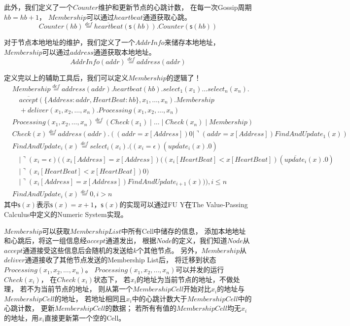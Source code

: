 此外，我们定义了一个$Counter$维护和更新节点的心跳计数，
在每一次Gossip周期$hb=hb+1$，
$Membership$可以通过$heartbeat$通道获取心跳。
\begin{equation}
   Counter(hb)\stackrel{def}{=}\overline{heartbeat}(\mathsf{s}(hb)).Counter(\mathsf{s}(hb))
\end{equation}

对于节点本地地址的维护，我们定义了一个$AddrInfo$来储存本地地址，
$Membership$可以通过$address$通道获取本地地址。
\begin{equation}
   AddrInfo(addr)\stackrel{def}{=}\overline{address}(addr)
\end{equation}

定义完以上的辅助工具后，我们可以定义$Membership$的逻辑了！
\begin{equation}
   \begin{split}
    &Membership\stackrel{def}{=}address(addr).heartbeat(hb).select_1(x_1)\dots select_n(x_n).\\
    &\quad\overline{accept}(\{Address:addr,HeartBeat:hb\},x_1,\dots,x_n).Membership\\
    &\quad+deliver(x_1,x_2,\dots,x_n).Processing(x_1,x_2,\dots,x_n)\\
    &Processing(x_1,x_2,\dots,x_n)\stackrel{def}{=}(Check(x_1)\mid  \dots \mid Check(x_n) \mid Membership)\\
    &Check(x)\stackrel{def}{=}address(addr).((addr=x[Address])0|\urcorner(addr=x[Address])FindAndUpdate_1(x))\\
    &FindAndUpdate_i(x)\stackrel{def}{=}select_i(x_i).((x_i = \epsilon) (\overline{update_i}(x).0)\\
    &\quad\mid \urcorner(x_i = \epsilon)((x_i[Address]=x[Address])((x_i[HeartBeat]<x[HeartBeat])(\overline{update_i}(x).0)\\
    &\quad\mid \urcorner (x_i[HeartBeat]<x[HeartBeat])0)\\
    &\quad\mid \urcorner (x_i[Address]=x[Address])FindAndUpdate_{i+1}(x))),i\leq n\\
    &FindAndUpdate_i(x)\stackrel{def}{=}0,i>n
    \end{split}
\end{equation}
其中$\mathsf{s}(x)$表示$\mathsf{s}(x)=x+1$，$\mathsf{s}(x)$的实现可以通过FU Y在The Value-Passing Calculus中定义的Numeric System实现\cite{Fu_VPC}。

$Membership$可以获取$MembershipList$中所有Cell中储存的信息，
添加本地地址和心跳后，将这一组信息经$accept$通道发出，
根据$Node$的定义，我们知道$Node$从$accept$通道接受这些信息后会随机的发送给$k$个其他节点。
另外，$Membership$从$deliver$通道接收了其他节点发送的Membership List后，
将迁移到状态$Processing(x_1,x_2,\dots,x_n)$。
$Processing(x_1,x_2,\dots,x_n)$可以并发的运行$Check(x_i)$，
在$Check(x_i)$状态下，
若$x_i$的地址为当前节点的地址，不做处理，
若不为当前节点的地址，
则从第一个$MembershipCell$开始对比$x_i$的地址与$MembershipCell$的地址，
若地址相同且$x_i$中的心跳计数大于$MembershipCell$中的心跳计数，
更新$MembershipCell$的数据；
若所有有值的$MembershipCell$均无$x_i$的地址，用$x_i$直接更新第一个空的Cell。

